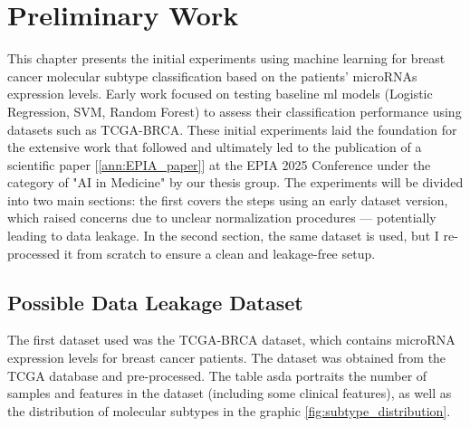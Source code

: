 
%
\chapter{Preliminary Work}

This chapter presents the initial experiments using machine learning for breast
cancer molecular subtype classification based on the patients’ microRNAs
expression levels. Early work focused on testing baseline \gls{ml} models
(Logistic Regression, SVM, Random Forest) to assess their classification
performance using datasets such as TCGA-BRCA. These initial experiments laid
the foundation for the extensive work that followed and ultimately led to the
publication of a scientific paper [\ref{ann:EPIA_paper}] at the EPIA 2025
Conference under the category of "AI in Medicine" by our thesis group. The
experiments will be divided into two main sections: the first covers the steps
using an early dataset version, which raised concerns due to unclear
normalization procedures — potentially leading to data leakage. In the second
section, the same dataset is used, but I re-processed it from scratch to ensure
a clean and leakage-free setup.

\section{Possible Data Leakage Dataset}

The first dataset used was the TCGA-BRCA dataset, which contains microRNA
expression levels for breast cancer patients. The dataset was obtained from the
TCGA database and pre-processed. The table asda portraits the number of samples
and features in the dataset (including some clinical features), as well as the
distribution of molecular subtypes in the graphic
\ref{fig:subtype_distribution}.

